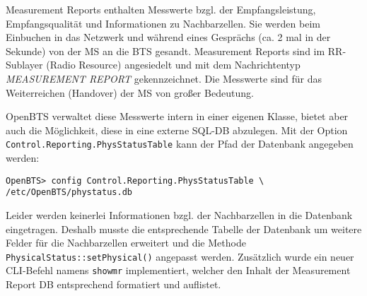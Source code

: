 Measurement Reports enthalten Messwerte bzgl. der Empfangsleistung, Empfangsqualität und Informationen zu Nachbarzellen. Sie werden beim Einbuchen in das Netzwerk und während eines Gesprächs (ca. 2 mal in der Sekunde) von der MS an die BTS gesandt. Measurement Reports sind im RR-Sublayer (Radio Resource) angesiedelt und mit dem Nachrichtentyp \textit{MEASUREMENT REPORT} gekennzeichnet. Die Messwerte sind für das Weiterreichen (Handover) der MS von großer Bedeutung.

OpenBTS verwaltet diese Messwerte intern in einer eigenen Klasse, bietet aber auch die Möglichkeit, diese in eine externe SQL-DB abzulegen. Mit der Option \verb|Control.Reporting.PhysStatusTable| kann der Pfad der Datenbank angegeben werden:
\begin{verbatim}
OpenBTS> config Control.Reporting.PhysStatusTable \
/etc/OpenBTS/phystatus.db
\end{verbatim}

Leider werden keinerlei Informationen bzgl. der Nachbarzellen in die Datenbank eingetragen. Deshalb musste die entsprechende Tabelle der Datenbank um weitere Felder für die Nachbarzellen erweitert und die Methode \verb|PhysicalStatus::setPhysical()| angepasst werden.
Zusätzlich wurde ein neuer CLI-Befehl namens \verb|showmr| implementiert, welcher den Inhalt der Measurement Report DB entsprechend formatiert und auflistet.

